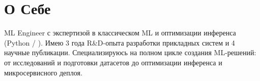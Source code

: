 \documentclass[letterpaper,11pt]{article}
\begin{document}

\section{О Себе}
\begin{itemize}[leftmargin=0.15in, label={}]
	\small{\item{ML Engineer с экспертизой в классическом ML и оптимизации инференса (Python / \cpp). Имею 3 года R\&D-опыта разработки прикладных систем и 4 научные публикации. Специализируюсь на полном цикле создания ML-решений: от исследований и подготовки датасетов до оптимизации инференса и микросервисного деплоя.}}
\end{itemize}

\def\currentRole{ML-инженер}


\def\currentProjects{%
  \projectBotDetector
  \projectChangeDetector
  \projectOttoRecsys
}





\end{document}
